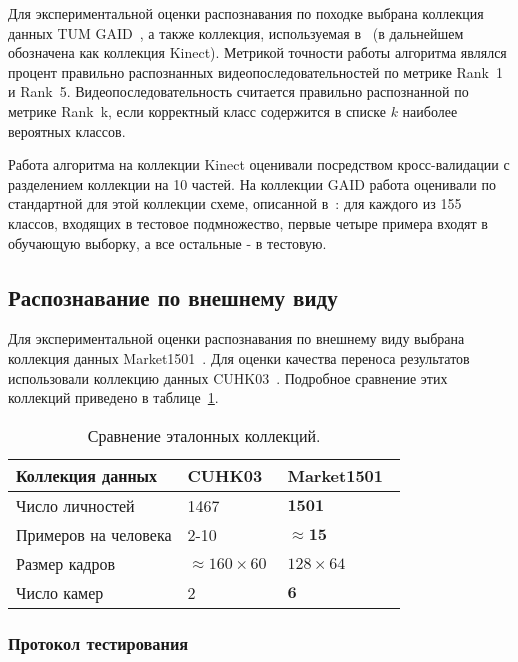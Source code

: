 \documentclass[a4paper,twoside,11pt]{article}
\numberwithin{equation}{section}
\begin{document}
Для экспериментальной оценки распознавания по походке выбрана коллекция данных TUM GAID~\cite{hofmann2014tum}, а также коллекция, используемая в~\cite{andersson2015person} (в дальнейшем обозначена как коллекция Kinect). Метрикой точности работы алгоритма являлся процент правильно распознанных видеопоследовательностей по метрике Rank~1 и Rank~5. Видеопоследовательность считается правильно распознанной по метрике Rank~k, если корректный класс содержится в списке $k$ наиболее вероятных классов.

Работа алгоритма на коллекции Kinect оценивали посредством кросс-валидации с разделением коллекции на 10 частей. На коллекции GAID работа оценивали по стандартной для этой коллекции схеме, описанной в~\cite{hofmann2014tum}: для каждого из 155 классов, входящих в тестовое подмножество, первые четыре примера входят в обучающую выборку, а все остальные - в тестовую.

\subsection{Распознавание по внешнему виду}

Для экспериментальной оценки распознавания по внешнему виду выбрана коллекция данных Market1501~\cite{zheng2015scalable}. Для оценки качества переноса результатов использовали коллекцию данных CUHK03~\cite{li2014deepreid}. Подробное сравнение этих коллекций приведено в таблице~\ref{datasets}.

\begin{table}[ht]
    \caption{Сравнение эталонных коллекций.}
    \label{datasets}
    \centering\medskip\tabcolsep=2pt%
    \begin{tabular}{ p{4cm} p{2cm} p{2cm} } 
        \hline 
        Коллекция данных & CUHK03~\cite{li2014deepreid} & Market1501~\cite{zheng2015scalable} \\
        \hline
        Число личностей & 1467 & $\mathbf{1501}$ \\
        Примеров на человека & 2-10 & $\mathbf{\approx 15}$ \\
        Размер кадров & $\approx160\times60$ & $128\times64$ \\
        Число камер & 2 & $\mathbf{6}$ \\
        \hline
    \end{tabular}
\end{table}
    
\subsubsection{Протокол тестирования}
\label{sec:protocol}
\end{document}
